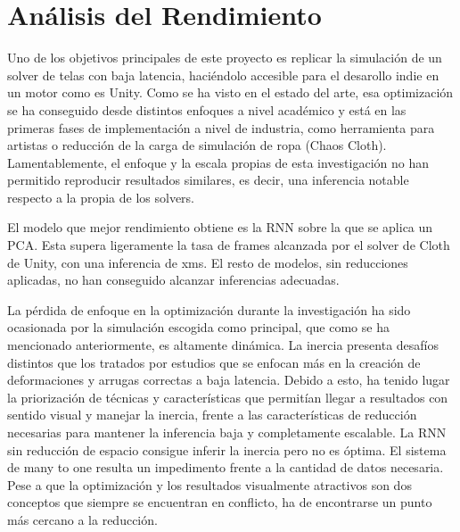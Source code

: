 \section{Análisis del Rendimiento}
\label{sec:Rendimiento}
Uno de los objetivos principales de este proyecto es replicar la simulación de un solver de telas con baja latencia, haciéndolo accesible para el desarollo indie en un motor como es Unity. Como se ha visto en el estado del arte, esa optimización se ha conseguido desde distintos enfoques a nivel académico y está en las primeras fases de implementación a nivel de industria, como herramienta para artistas o reducción de la carga de simulación de ropa (Chaos Cloth). Lamentablemente, el enfoque y la escala propias de esta investigación no han permitido reproducir resultados similares, es decir, una inferencia notable respecto a la propia de los solvers. \newline

El modelo que mejor rendimiento obtiene es la RNN sobre la que se aplica un PCA. Esta supera ligeramente la tasa de frames alcanzada por el solver de Cloth de Unity, con una inferencia de xms. El resto de modelos, sin reducciones aplicadas, no han conseguido alcanzar inferencias adecuadas.

La pérdida de enfoque en la optimización durante la investigación ha sido ocasionada por la simulación escogida como principal, que como se ha mencionado anteriormente, es altamente dinámica. La inercia presenta desafíos distintos que los tratados por estudios que se enfocan más en la creación de deformaciones y arrugas correctas a baja latencia. Debido a esto, ha tenido lugar la priorización de técnicas y características que permitían llegar a resultados con sentido visual y manejar la inercia, frente a las características de reducción necesarias para mantener la inferencia baja y completamente escalable. La RNN sin reducción de espacio consigue inferir la inercia pero no es óptima. El sistema de many to one resulta un impedimento frente a la cantidad de datos necesaria. Pese a que la optimización y los resultados visualmente atractivos son dos conceptos que siempre se encuentran en conflicto, ha de encontrarse un punto más cercano a la reducción.



